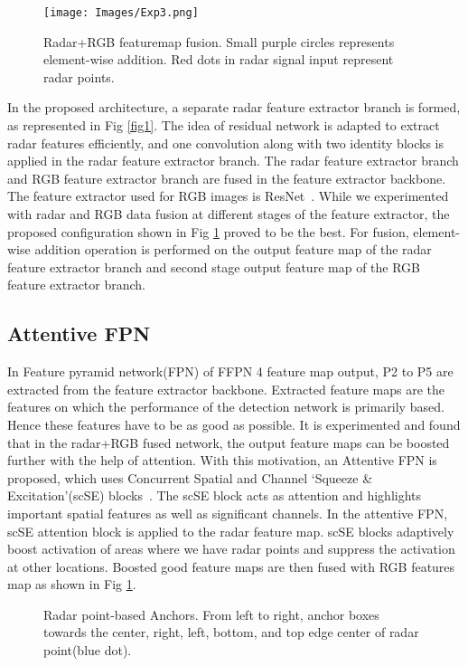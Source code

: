 \documentclass{article}
\begin{document}
\begin{figure}[htbp]
\centerline{\texttt{[image: Images/Exp3.png]}}
\caption{Radar+RGB featuremap fusion. Small purple circles represents element-wise addition. Red dots in radar signal input represent radar points.}
\label{fig2}
\end{figure}
In the proposed architecture, a separate radar feature extractor branch is formed, as represented in Fig \ref{fig1}. The idea of residual network is adapted to extract radar features efficiently, and one convolution along with two identity blocks is applied in the radar feature extractor branch. The radar feature extractor branch and RGB feature extractor branch are fused in the feature extractor backbone. The feature extractor used for RGB images is ResNet~\cite{he2016deep}. While we experimented with radar and RGB data fusion at different stages of the feature extractor, the proposed configuration shown in Fig \ref{fig2} proved to be the best. For fusion, element-wise addition operation is performed on the output feature map of the radar feature extractor branch and second stage output feature map of the RGB feature extractor branch.
\subsection{Attentive FPN}
In Feature pyramid network(FPN) of FFPN 4 feature map output, P2 to P5 are extracted from the feature extractor backbone. Extracted feature maps are the features on which the performance of the detection network is primarily based. Hence these features have to be as good as possible. 
It is experimented and found that in the radar+RGB fused network, the output feature maps can be boosted further with the help of attention. With this motivation, an Attentive FPN is proposed, which uses Concurrent Spatial and Channel ‘Squeeze \& Excitation’(scSE) blocks~\cite{roy2018concurrent}. The scSE block acts as attention and highlights important spatial features as well as significant channels. In the attentive FPN, scSE attention block is applied to the radar feature map. scSE blocks adaptively boost activation of areas where we have radar points and suppress the activation at other locations. Boosted good feature maps are then fused with RGB features map as shown in Fig \ref{fig2}.

\begin{figure}
    \centering
    \caption{Radar point-based Anchors. From left to right, anchor boxes towards the center, right, left, bottom, and top edge center of radar point(blue dot).}
    \label{fig3}
\end{figure}
\end{document}
